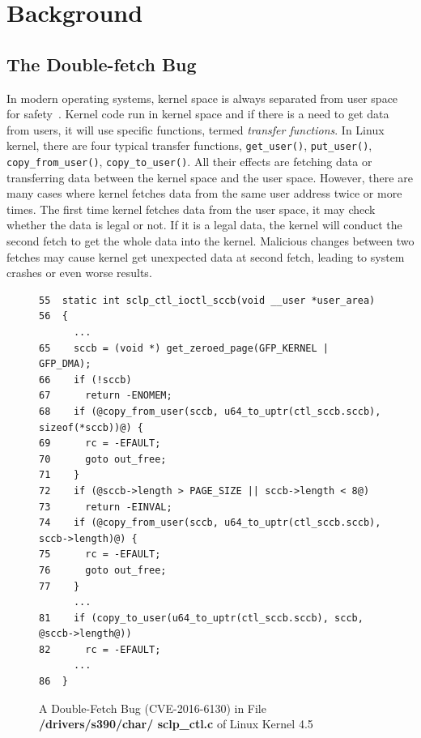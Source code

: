 \documentclass[10pt]{llncs}
\begin{document}
\section{Background}%
\label{back}


\subsection{The Double-fetch Bug}
\label{back1}
In modern operating systems, kernel space is always separated from user space for safety~\cite{swift2003improving}. Kernel code run in kernel space and if there is a need to get data from users, it will use specific functions, termed \emph{transfer functions}. In Linux kernel, there are four typical transfer functions, \verb:get_user():, \verb:put_user():, \verb:copy_from_user():, \verb:copy_to_user():. All their effects are fetching data or transferring data between the kernel space and the user space. However, there are many cases where kernel fetches data from the same user address twice or more times. The first time kernel fetches data from the user space, it may check whether the data is legal or not. If it is a legal data, the kernel will conduct the second fetch to get the whole data into the kernel. Malicious changes between two fetches may cause kernel get unexpected data at second fetch, leading to system crashes or even worse results.


\begin{figure}[t]
  \centering
\begin{lstlisting}[style=code]
55  static int sclp_ctl_ioctl_sccb(void __user *user_area)
56  {
	  ...
65    sccb = (void *) get_zeroed_page(GFP_KERNEL | GFP_DMA);
66    if (!sccb)
67      return -ENOMEM;
68    if (@copy_from_user(sccb, u64_to_uptr(ctl_sccb.sccb), sizeof(*sccb))@) {
69      rc = -EFAULT;
70      goto out_free;
71    }
72    if (@sccb->length > PAGE_SIZE || sccb->length < 8@)
73      return -EINVAL;
74    if (@copy_from_user(sccb, u64_to_uptr(ctl_sccb.sccb), sccb->length)@) {
75      rc = -EFAULT;
76      goto out_free;
77    }
	  ...
81    if (copy_to_user(u64_to_uptr(ctl_sccb.sccb), sccb, @sccb->length@))
82      rc = -EFAULT;
  	  ...
86  }
\end{lstlisting}
  \caption{A Double-Fetch Bug (CVE-2016-6130) in File \textbf{/drivers/s390/char/ sclp\_ctl.c} of Linux Kernel 4.5}
  \label{df-6130}
\end{figure}
\end{document}
